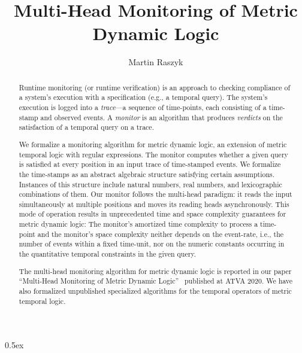 \documentclass[10pt,a4paper]{article}
\begin{document}
\title{Multi-Head Monitoring of Metric Dynamic Logic}
\author{Martin Raszyk}

\maketitle

\begin{abstract}
Runtime monitoring (or runtime verification)
is an approach to checking compliance
of a system's execution with a specification (e.g., a temporal query).
The system's execution is logged into a \emph{trace}---a sequence of time-points,
each consisting of a time-stamp and observed events.
A \emph{monitor} is an algorithm that produces \emph{verdicts}
on the satisfaction of a temporal query on a trace.

We formalize a monitoring algorithm for metric dynamic logic, an extension of
metric temporal logic with regular expressions. The monitor computes whether a
given query is satisfied at every position in an input trace of
time-stamped events. We formalize the time-stamps as an abstract algebraic
structure satisfying certain assumptions. Instances of this structure
include natural numbers, real numbers, and lexicographic combinations of them.
Our monitor follows the multi-head paradigm: it reads the
input simultaneously at multiple positions and moves its reading heads
asynchronously. This mode of operation results in unprecedented time and space
complexity guarantees for metric dynamic logic: The monitor's amortized time
complexity to process a time-point and the monitor's space complexity
neither depends on the event-rate, i.e., the number of events within a fixed
time-unit, nor on the numeric constants occurring in the quantitative temporal
constraints in the given query.

The multi-head monitoring algorithm for metric dynamic logic
is reported in our paper ``Multi-Head Monitoring of Metric Dynamic Logic''~\cite{DBLP:conf/atva/RaszykBT20}
published at ATVA 2020.
We have also formalized unpublished specialized algorithms
for the temporal operators of metric temporal logic.
\end{abstract}

\tableofcontents

\parindent 0pt\parskip 0.5ex





\end{document}
